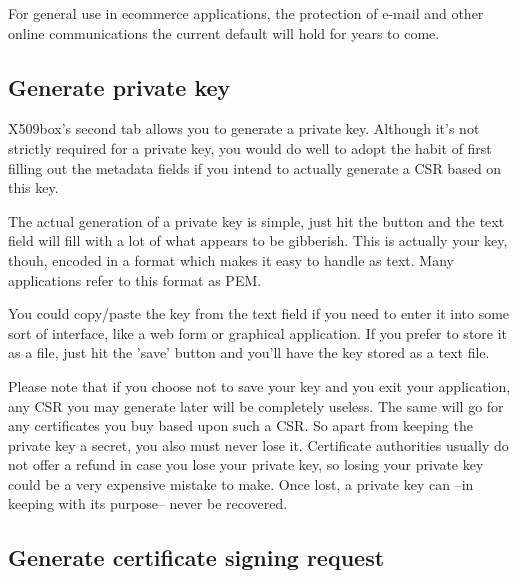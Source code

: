 \documentclass[a4paper,12pt]{article}
\begin{document}
For general use in ecommerce applications, the protection of e-mail and other online communications the current default will hold for years to come.

\subsection{Generate private key}
X509box's second tab allows you to generate a private key. Although it's not strictly required for a private key, you would do well to adopt the habit of first filling out the metadata fields if you intend to actually generate a CSR based on this key.

The actual generation of a private key is simple, just hit the button and the text field will fill with a lot of what appears to be gibberish. This is actually your key, thouh, encoded in a format which makes it easy to handle as text. Many applications refer to this format as PEM.

You could copy/paste the key from the text field if you need to enter it into some sort of interface, like a web form or graphical application. If you prefer to store it as a file, just hit the 'save' button and you'll have the key stored as a text file.

Please note that if you choose not to save your key and you exit your application, any CSR you may generate later will be completely useless. The same will go for any certificates you buy based upon such a CSR. So apart from keeping the private key a secret, you also must never lose it. Certificate authorities usually do not offer a refund in case you lose your private key, so losing your private key could be a very expensive mistake to make. Once lost, a private key can --in keeping with its purpose-- never be recovered.

\subsection{Generate certificate signing request}
\end{document}
